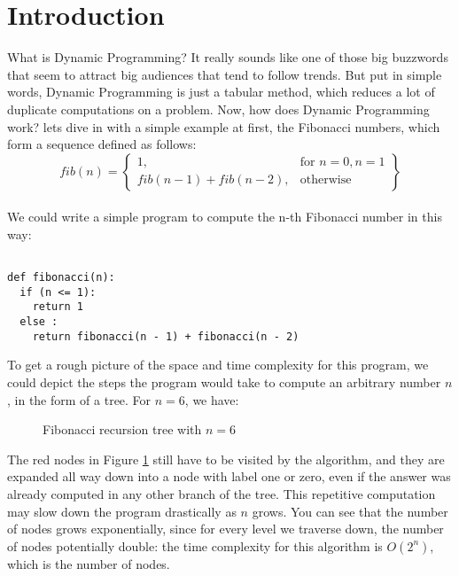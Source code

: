 
 
 \section{Introduction}


What is Dynamic Programming? It really sounds like one of those big buzzwords that seem to
attract big audiences that tend to follow trends. But put in simple words, Dynamic Programming is just a tabular method, 
which reduces a lot of duplicate computations on a problem. Now, how does Dynamic Programming work? lets dive in with a simple example at first, the Fibonacci numbers,
which form a sequence defined as follows:
  \\
  \[
    fib(n) = \left\{\begin{array}{lr}
      1, & \text{for } n = 0, n = 1\\
      fib(n-1) + fib(n-2), & \text{otherwise}
      \end{array}\right\}
  \]
  \\

We could write a simple program to compute the n-th Fibonacci number in this way:

\begin{verbatim}

def fibonacci(n):
  if (n <= 1):
    return 1
  else :
    return fibonacci(n - 1) + fibonacci(n - 2)

\end{verbatim}


To get a rough picture of the space and time complexity for this program, we could depict the steps
the program would take to compute an arbitrary number $n$, in the form of a tree. For $n = 6$, we have:


\begin{figure}[ht]
  \centering
  \caption{Fibonacci recursion tree with $n = 6$}
  \label{fig:fib1}
\end{figure}

The red nodes in Figure \ref{fig:fib1} still have to be visited by the algorithm, and they are expanded all 
way down into a node with label one or zero, even if the answer was already computed in any other 
branch of the tree. This repetitive computation may slow down the program drastically as $n$ grows.
You can see that the number of nodes grows exponentially, since for every level we traverse down,
the number of nodes potentially double: the time complexity for this algorithm is $O(2^n)$, which is 
the number of nodes.

